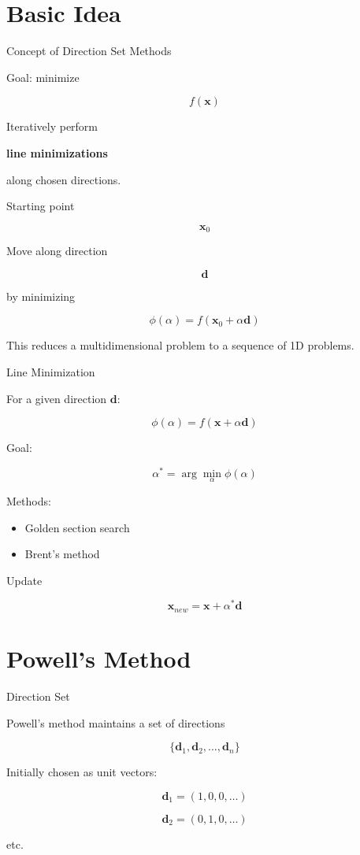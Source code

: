 \documentclass[aspectratio=169]{beamer}
\begin{document}
\section{Basic Idea}

\begin{frame}{Concept of Direction Set Methods}

Goal: minimize

\[
f(\mathbf{x})
\]

Iteratively perform

\textbf{line minimizations}

along chosen directions.

Starting point

\[
\mathbf{x}_0
\]

Move along direction

\[
\mathbf{d}
\]

by minimizing

\[
\phi(\alpha) = f(\mathbf{x}_0 + \alpha \mathbf{d})
\]

This reduces a multidimensional problem to a sequence of 1D problems.
\end{frame}

\begin{frame}{Line Minimization}

For a given direction $\mathbf{d}$:

\[
\phi(\alpha) = f(\mathbf{x} + \alpha \mathbf{d})
\]

Goal:

\[
\alpha^* = \arg\min_\alpha \phi(\alpha)
\]

Methods:

\begin{itemize}
\item Golden section search
\item Brent's method
\end{itemize}

Update

\[
\mathbf{x}_{new} = \mathbf{x} + \alpha^* \mathbf{d}
\]
\end{frame}

\section{Powell's Method}

\begin{frame}{Direction Set}

Powell's method maintains a set of directions

\[
\{\mathbf{d}_1,\mathbf{d}_2,\dots,\mathbf{d}_n\}
\]

Initially chosen as unit vectors:

\[
\mathbf{d}_1 = (1,0,0,\dots)
\]

\[
\mathbf{d}_2 = (0,1,0,\dots)
\]

etc.
\end{frame}
\end{document}
